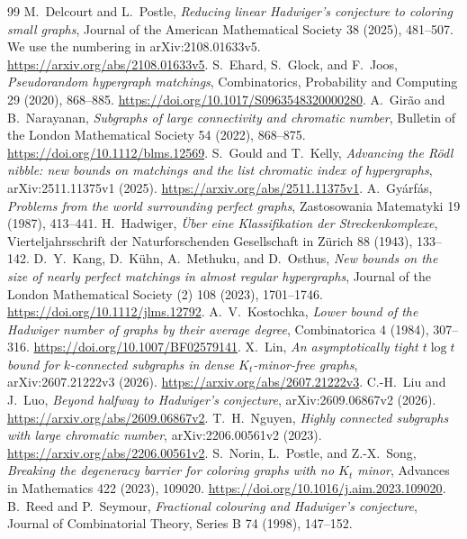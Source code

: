 \documentclass[11pt]{article}
\begin{document}
\begin{thebibliography}{99}
\setlength{\itemsep}{2pt}
 M.~Delcourt and L.~Postle,
\emph{Reducing linear Hadwiger's conjecture to coloring small graphs},
Journal of the American Mathematical Society 38 (2025), 481--507.
We use the numbering in arXiv:2108.01633v5.
\url{https://arxiv.org/abs/2108.01633v5}.
 S.~Ehard, S.~Glock, and F.~Joos,
\emph{Pseudorandom hypergraph matchings},
Combinatorics, Probability and Computing 29 (2020), 868--885.
\url{https://doi.org/10.1017/S0963548320000280}.
 A.~Gir\~ao and B.~Narayanan,
\emph{Subgraphs of large connectivity and chromatic number},
Bulletin of the London Mathematical Society 54 (2022), 868--875.
\url{https://doi.org/10.1112/blms.12569}.
 S.~Gould and T.~Kelly,
\emph{Advancing the R\"odl nibble: new bounds on matchings and the
list chromatic index of hypergraphs},
arXiv:2511.11375v1 (2025).
\url{https://arxiv.org/abs/2511.11375v1}.
 A.~Gy\'arf\'as,
\emph{Problems from the world surrounding perfect graphs},
Zastosowania Matematyki 19 (1987), 413--441.
 H.~Hadwiger,
\emph{\"Uber eine Klassifikation der Streckenkomplexe},
Vierteljahrsschrift der Naturforschenden Gesellschaft in Z\"urich
88 (1943), 133--142.
 D.~Y.~Kang, D.~K\"uhn, A.~Methuku, and D.~Osthus,
\emph{New bounds on the size of nearly perfect matchings in almost
regular hypergraphs},
Journal of the London Mathematical Society (2) 108 (2023), 1701--1746.
\url{https://doi.org/10.1112/jlms.12792}.
 A.~V.~Kostochka,
\emph{Lower bound of the Hadwiger number of graphs by their average degree},
Combinatorica 4 (1984), 307--316.
\url{https://doi.org/10.1007/BF02579141}.
 X.~Lin,
\emph{An asymptotically tight $t\log t$ bound for $k$-connected subgraphs
in dense $K_t$-minor-free graphs},
arXiv:2607.21222v3 (2026).
\url{https://arxiv.org/abs/2607.21222v3}.
 C.-H.~Liu and J.~Luo,
\emph{Beyond halfway to Hadwiger's conjecture},
arXiv:2609.06867v2 (2026).
\url{https://arxiv.org/abs/2609.06867v2}.
 T.~H.~Nguyen,
\emph{Highly connected subgraphs with large chromatic number},
arXiv:2206.00561v2 (2023).
\url{https://arxiv.org/abs/2206.00561v2}.
 S.~Norin, L.~Postle, and Z.-X.~Song,
\emph{Breaking the degeneracy barrier for coloring graphs with no
$K_t$ minor}, Advances in Mathematics 422 (2023), 109020.
\url{https://doi.org/10.1016/j.aim.2023.109020}.
 B.~Reed and P.~Seymour,
\emph{Fractional colouring and Hadwiger's conjecture},
Journal of Combinatorial Theory, Series B 74 (1998), 147--152.

\end{thebibliography}
\end{document}
